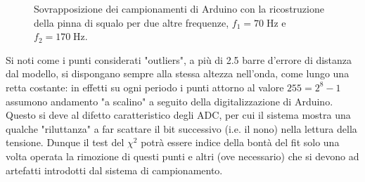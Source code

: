 \documentclass{article}[a4paper, oneside ,11pt]
\begin{document}
\begin{figure}[!htb]
	\scalebox{0.55}{}\hfill \scalebox{0.55}{}
 	\caption{Sovrapposizione dei campionamenti di Arduino con la ricostruzione della pinna di squalo per due altre frequenze, $f_1 = 70 \; \si{\hertz}$ e $f_2 = 170 \; \si{\hertz}$. \label{plt:fins}}
\end{figure}
Si noti come i punti considerati "outliers", a più di 2.5 barre d'errore di distanza dal modello, si dispongano sempre alla stessa altezza nell'onda, come lungo una retta costante: in effetti su ogni periodo i punti attorno al valore $255 = 2^8 -1$ assumono andamento "a scalino" a seguito della digitalizzazione di Arduino. Questo si deve al difetto caratteristico degli ADC, per cui il sistema mostra una qualche "riluttanza" a far scattare il bit successivo (i.e. il nono) nella lettura della tensione. Dunque il test del $\chi^2$ potrà essere indice della bontà del fit solo una volta operata la rimozione di questi punti e altri (ove necessario) che si devono ad artefatti introdotti dal sistema di campionamento.
\end{document}
